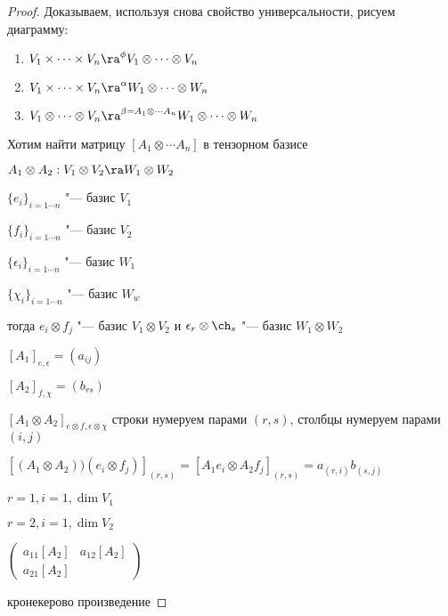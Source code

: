 \begin{proof}
    Доказываем, используя снова свойство универсальности, рисуем диаграмму:
    \begin{enumerate}
        \item $V_1 \times \cdots \times V_n \ra^\phi V_1 \otimes \cdots \otimes V_n$
        \item $V_1 \times \cdots \times V_n \ra^\alpha W_1 \otimes \cdots \otimes W_n$
        \item $V_1 \otimes \cdots \otimes V_n \ra^{\beta =  A_1 \otimes \cdots A_n} W_1 \otimes \cdots \otimes W_n$
    \end{enumerate}

    Хотим найти матрицу $[A_1 \otimes \cdots A_n]$ в тензорном базисе

    $A_1 \otimes A_2: V_1 \otimes V_2 \ra W_1 \otimes W_2$

    $\{e_i\}_{i=1\cdots n}$ "--- базис $V_1$

    $\{f_i\}_{i=1\cdots n}$ "--- базис $V_2$

    $\{\epsilon_i\}_{i=1\cdots n}$ "--- базис $W_1$

    $\{\chi_i\}_{i=1\cdots n}$ "--- базис $W_w$

    тогда $e_i \otimes f_j$ "--- базис $V_1 \otimes V_2$ и $\epsilon_r \otimes \ch_s$ "--- базис $W_1 \otimes W_2$

    $[A_1]_{e, \epsilon} = (a_{ij})$

    $[A_2]_{f, \chi} = (b_{rs})$

    $[A_1 \otimes A_2]_{e \otimes f, \epsilon \otimes \chi}$ строки нумеруем парами $(r, s)$, столбцы нумеруем парами $(i, j)$

	$[(A_1 \otimes A_2))(e_i \otimes f_j)]_{(r, s)} = [A_1e_i \otimes A_2f_j]_{(r,s)} = a_{(r, i)}b_{(s, j)}$

    $r = 1, i = 1, \dim V_1$

    $r = 2, i = 1, \dim V_2$

    $\begin{pmatrix}
        a_{11}[A_2] & a_{12}[A_2]\\
        a_{21}[A_2] & 
    \end{pmatrix}$

    кронекерово произведение
    
\end{proof}
